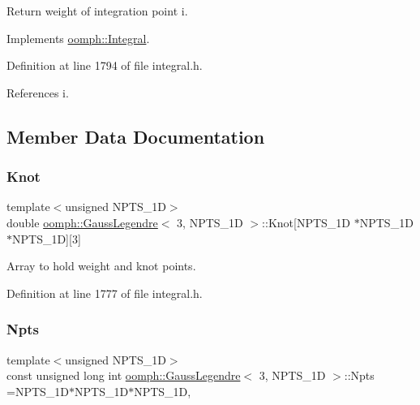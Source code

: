 Return weight of integration point i. 



Implements \hyperlink{classoomph_1_1Integral_ac65335e2aab120b285b3d6c294507b06}{oomph\+::\+Integral}.



Definition at line 1794 of file integral.\+h.



References i.



\subsection{Member Data Documentation}
\mbox{\label{classoomph_1_1GaussLegendre_3_013_00_01NPTS__1D_01_4_a171c480404bb5c39a099f93a897b55b5}} 
\subsubsection{\texorpdfstring{Knot}{Knot}}
{\footnotesize\ttfamily template$<$unsigned N\+P\+T\+S\+\_\+1D$>$ \\
double \hyperlink{classoomph_1_1GaussLegendre}{oomph\+::\+Gauss\+Legendre}$<$ 3, N\+P\+T\+S\+\_\+1D $>$\+::Knot\mbox{[}N\+P\+T\+S\+\_\+1D $\ast$N\+P\+T\+S\+\_\+1D $\ast$N\+P\+T\+S\+\_\+1D\mbox{]}\mbox{[}3\mbox{]}\hspace{0.3cm}{\ttfamily [private]}}



Array to hold weight and knot points. 



Definition at line 1777 of file integral.\+h.

\mbox{\label{classoomph_1_1GaussLegendre_3_013_00_01NPTS__1D_01_4_a3aba142a86a348d09bbeca16f3d72f52}} 
\subsubsection{\texorpdfstring{Npts}{Npts}}
{\footnotesize\ttfamily template$<$unsigned N\+P\+T\+S\+\_\+1D$>$ \\
const unsigned long int \hyperlink{classoomph_1_1GaussLegendre}{oomph\+::\+Gauss\+Legendre}$<$ 3, N\+P\+T\+S\+\_\+1D $>$\+::Npts =N\+P\+T\+S\+\_\+1D$\ast$N\+P\+T\+S\+\_\+1D$\ast$N\+P\+T\+S\+\_\+1D\hspace{0.3cm}{\ttfamily [static]}, {\ttfamily [private]}}



